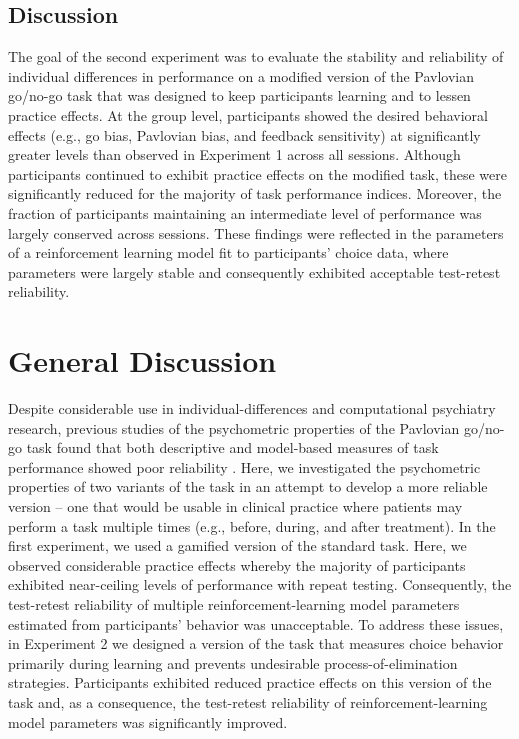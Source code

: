 \documentclass[a4paper,12pt]{article}
\begin{document}
\begin{refsection}[main]
\subsection*{Discussion}

The goal of the second experiment was to evaluate the stability and reliability of individual differences in performance on a modified version of the Pavlovian go/no-go task that was designed to keep participants learning and to lessen practice effects. At the group level, participants showed the desired behavioral effects (e.g., go bias, Pavlovian bias, and feedback sensitivity) at significantly greater levels than observed in Experiment 1 across all sessions. Although participants continued to exhibit practice effects on the modified task, these were significantly reduced for the majority of task performance indices. Moreover, the fraction of participants maintaining an intermediate level of performance was largely conserved across sessions. These findings were reflected in the parameters of a reinforcement learning model fit to participants' choice data, where parameters were largely stable and consequently exhibited acceptable test-retest reliability.

\section*{General Discussion}

Despite considerable use in individual-differences and computational psychiatry research, previous studies of the psychometric properties of the Pavlovian go/no-go task found that both descriptive and model-based measures of task performance showed poor reliability \cite{moutoussis2018change, pike2022test, saeedpour2023interindividual}. Here, we investigated the psychometric properties of two variants of the task in an attempt to develop a more reliable version -- one that would be usable in clinical practice where patients may perform a task multiple times (e.g., before, during, and after treatment). In the first experiment, we used a gamified version of the standard task. Here, we observed considerable practice effects whereby the majority of participants exhibited near-ceiling levels of performance with repeat testing. Consequently, the test-retest reliability of multiple reinforcement-learning model parameters estimated from participants' behavior was unacceptable. To address these issues, in Experiment 2 we designed a version of the task that measures choice behavior primarily during learning and prevents undesirable process-of-elimination strategies. Participants exhibited reduced practice effects on this version of the task and, as a consequence, the test-retest reliability of reinforcement-learning model parameters was significantly improved.


\end{refsection}
\end{document}
